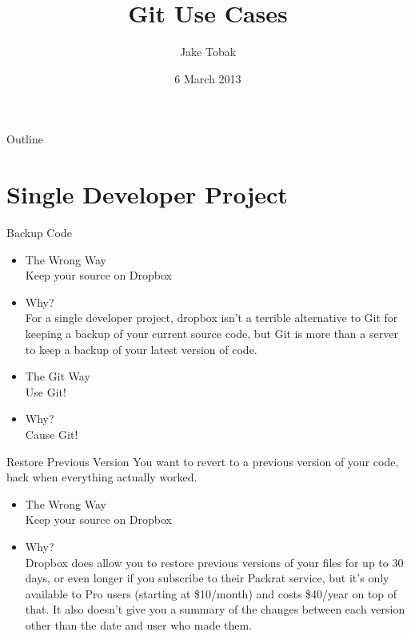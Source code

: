 \documentclass{beamer}
\title{Git Use Cases}
\author{Jake Tobak}
\institute{Engineering and Computer Science Interest Group \\
           URI Student ACM Chapter}
\date{6 March 2013}
\begin{document}
\frame{\titlepage}

\begin{frame}{Outline}
  \tableofcontents
\end{frame}


\section{Single Developer Project}
\begin{frame}{Backup Code}
  \begin{itemize}
  \item The Wrong Way\\
          Keep your source on Dropbox
  \pause
  \item Why?\\
        For a single developer project, dropbox isn't a terrible alternative to Git for keeping a backup of your current source code, but Git is more than a server to keep a backup of your latest version of code.
  \pause
  \item The Git Way\\
        Use Git!
  \pause
  \item Why?\\
        Cause Git!
  
  \end{itemize}
  

\end{frame}

\begin{frame}{Restore Previous Version}
  You want to revert to a previous version of your code, back when everything actually worked.
  \begin{itemize}
  \item The Wrong Way\\
          Keep your source on Dropbox
  \pause
  \item Why?\\
        Dropbox does allow you to restore previous versions of your files for up to 30 days, or even longer if you subscribe to their Packrat service, but it's only available to Pro users (starting at \$10/month) and costs \$40/year on top of that. It also doesn't give you a summary of the changes between each version other than the date and user who made them.
        \end{itemize}
\end{frame}
\end{document}
